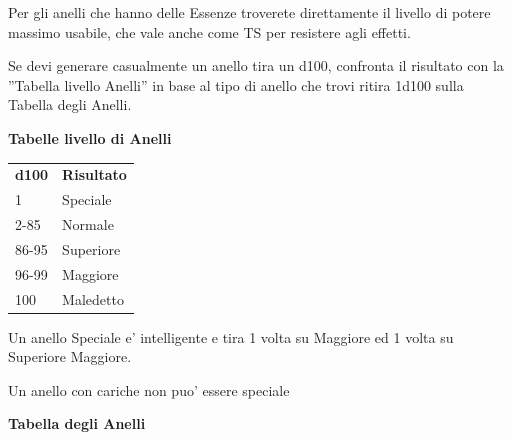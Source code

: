 \documentclass[a4paper,11pt,twoside,openany]{book}
\begin{document}
Per gli anelli che hanno delle Essenze troverete direttamente il livello di potere massimo usabile, che vale anche come TS per resistere agli effetti.

Se devi generare casualmente un anello tira un d100, confronta il risultato con la ''Tabella livello Anelli'' in base al tipo di anello che trovi ritira 1d100 sulla Tabella degli Anelli.

\bigskip

\textbf{Tabelle livello di Anelli}
\medskip
\begin{tabular}{ll}
\toprule
\textbf{d100} & \textbf{Risultato}\tabularnewline
1 & Speciale\tabularnewline
2-85 & Normale\tabularnewline
86-95 & Superiore\tabularnewline
96-99 & Maggiore\tabularnewline
100 & Maledetto\tabularnewline

\end{tabular}

\bigskip

Un anello Speciale e' intelligente e tira 1 volta su Maggiore ed 1 volta su Superiore Maggiore.

Un anello con cariche non puo' essere speciale

\pagebreak

\textbf{Tabella degli Anelli}

\medskip
\end{document}
